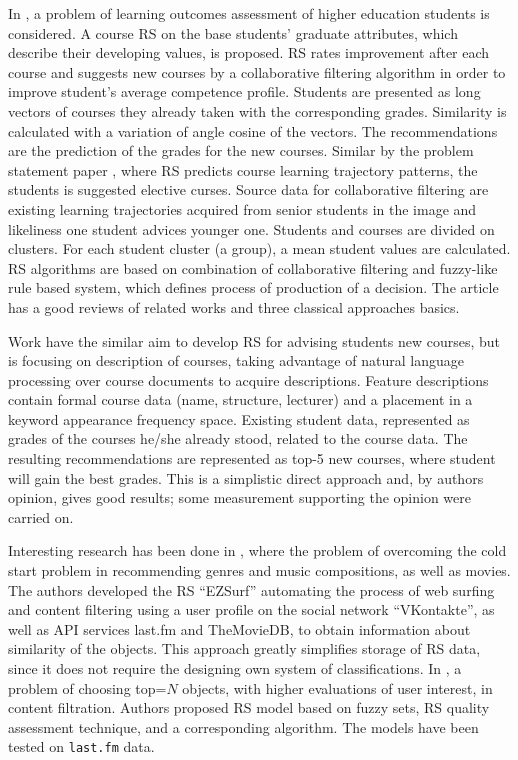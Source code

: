 \documentclass[conference]{IEEEtran}
\begin{document}
In \cite{bakh}, a problem of learning outcomes assessment of higher education students is considered.  A course RS on the base students' graduate attributes, which describe their developing values, is proposed.  RS rates improvement after each course and suggests new courses by a collaborative filtering algorithm in order to improve student's average competence profile.  Students are presented as long vectors of courses they already taken with the corresponding grades.  Similarity is calculated with a variation of angle cosine of the vectors.  The recommendations are the prediction of the grades for the new courses.  Similar by the problem statement paper \cite{amer}, where RS predicts course learning trajectory patterns, the students is suggested elective curses.  Source data for collaborative filtering are existing learning trajectories acquired from senior students in the image and likeliness one student advices younger one. Students and courses are divided on clusters.  For each student cluster (a group), a mean student values are calculated.  RS algorithms are based on combination of collaborative filtering and fuzzy-like rule based system, which defines process of production of a decision.  The article has a good reviews of related works and three classical approaches basics.

Work \cite{naren} have the similar aim to develop RS for advising students new courses, but is focusing on description of courses, taking advantage of natural language processing over course documents to acquire descriptions.  Feature descriptions contain formal course data (name, structure, lecturer) and a placement in a keyword appearance frequency space.  Existing student data, represented as grades of the courses he/she already stood, related to the course data.  The resulting recommendations are represented as top-5 new courses, where student will gain the best grades.  This is a simplistic direct approach and, by authors opinion, gives good results; some measurement supporting the opinion were carried on.



Interesting research has been done in \cite{br10}, where the problem of overcoming the cold start problem in recommending genres and music compositions, as well as movies.  The authors developed the RS ``EZSurf'' automating the process of web surfing and content filtering using a user profile on the social network ``VKontakte'', as well as API services last.fm and TheMovieDB, to obtain information about similarity of the objects.  This approach greatly simplifies storage of RS data, since it does not require the designing own system of classifications.  In \cite{br14}, a problem of choosing top=$N$ objects, with higher evaluations of user interest, in content filtration.  Authors proposed RS model based on fuzzy sets, RS quality assessment technique, and a corresponding algorithm.  The models have been tested on \texttt{last.fm} data.
\end{document}
